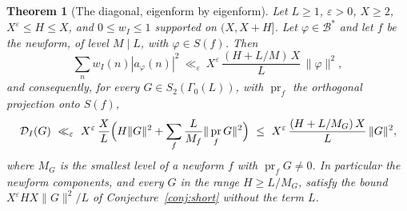 \documentclass[11pt]{amsart}
\newtheorem{theorem}{Theorem}[section]
\theoremstyle{remark}
\newcommand{\cB}{\mathcal{B}}
\newcommand{\e}{\varepsilon}
\DeclareMathOperator{\pr}{pr}
\begin{document}
\begin{theorem}[The diagonal, eigenform by eigenform]\label{prop:diag}
Let $L\ge1$, $\e>0$, $X\ge2$, $X^{\e}\le H\le X$, and $0\le w_I\le1$ supported on $(X,X+H]$. Let $\varphi\in\cB^*$ and let $f$ be the newform, of level $M\mid L$, with $\varphi\in S(f)$. Then
\begin{equation}\label{eq:eigenms}
\sum_nw_I(n)|a_\varphi(n)|^2\ \ll_\e\ X^{\e}\,\frac{(H+L/M)\,X}{L}\,\|\varphi\|^2,
\end{equation}
and consequently, for every $G\in S_2(\Gamma_0(L))$, with $\pr_f$ the orthogonal projection onto $S(f)$,
\begin{equation}\label{eq:diagG}
\mathcal D_I(G)\ \ll_\e\ X^{\e}\,\frac XL\Bigl(H\|G\|^2+\sum_f\frac L{M_f}\|\pr_fG\|^2\Bigr)\ \le\ X^{\e}\,\frac{(H+L/M_G)\,X}{L}\,\|G\|^2,
\end{equation}
where $M_G$ is the smallest level of a newform $f$ with $\pr_fG\ne0$. In particular the newform components, and every $G$ in the range $H\ge L/M_G$, satisfy the bound $X^\e HX\|G\|^2/L$ of Conjecture~\ref{conj:short} without the term $L$.
\end{theorem}
\end{document}
